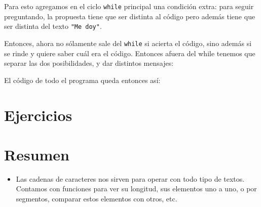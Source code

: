 \begin{enumerate}
Para esto agregamos en el ciclo \lstinline!while! principal una condición
extra: para seguir preguntando, la propuesta tiene que ser distinta al
código pero además tiene que ser distinta del texto \lstinline!"Me doy"!.



Entonces, ahora no sólamente sale del \lstinline!while! si acierta el
código, sino además si se rinde y quiere saber cuál era el código. Entonces
afuera del while tenemos que separar las dos posibilidades, y dar distintos
mensajes:



El código de todo el programa queda entonces así:


\end{enumerate}

\section{Ejercicios}



\section{Resumen}

\begin{itemize}
\item Las cadenas de caracteres nos sirven para operar con todo tipo de
textos.  Contamos con funciones para ver su longitud, sus elementos uno a
uno, o por segmentos, comparar estos elementos con otros, etc.


\end{itemize}

